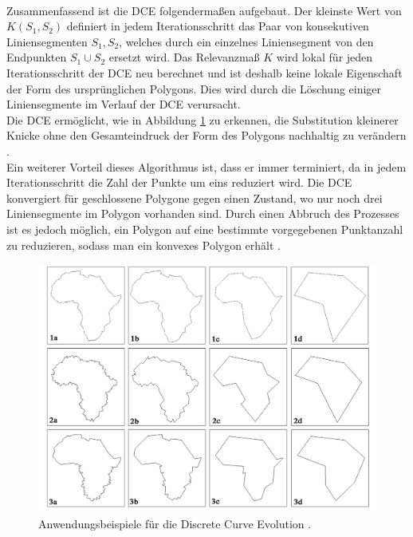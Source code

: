 { \\ 
 Zusammenfassend ist die DCE folgendermaßen aufgebaut. Der kleinste Wert von $K(S_1,S_2)$ definiert in jedem Iterationsschritt das Paar von konsekutiven Liniensegmenten $S_1, S_2$, welches durch ein einzelnes Liniensegment von den Endpunkten $S_1 \cup S_2$ ersetzt wird. Das Relevanzmaß $K$ wird lokal für jeden Iterationsschritt der DCE neu berechnet und ist deshalb keine lokale Eigenschaft der Form des ursprünglichen Polygons. Dies wird durch die Löschung einiger Liniensegmente im Verlauf der DCE verursacht.\\ Die DCE ermöglicht, wie in Abbildung \ref{Bsp_DCE_Bark_Paper} zu erkennen, die Substitution kleinerer Knicke ohne den Gesamteindruck der Form des Polygons nachhaltig zu verändern \citep{Barkowsky2000}.
 \\
 Ein weiterer Vorteil dieses Algorithmus ist, dass er immer terminiert, da in jedem Iterationsschritt die Zahl der Punkte um eins reduziert wird. Die DCE konvergiert für geschlossene Polygone gegen einen Zustand, wo nur noch drei Liniensegmente im Polygon vorhanden sind. Durch einen Abbruch des Prozesses ist es jedoch möglich, ein Polygon auf eine bestimmte vorgegebenen Punktanzahl zu reduzieren, sodass man ein konvexes Polygon erhält \citep{Barkowsky2000}.
 \begin{figure}[ht]
	   \centering
	   \includegraphics*[scale = 1, keepaspectratio, trim=2 2 2 2 ]{images/schem_maps_paper_DCE.png}
	   \caption[Anwendungsbeispiele für die \glqq Discrete Curve Evolution\grqq{}]{Anwendungsbeispiele für die \glqq Discrete Curve Evolution\grqq{}  \citep{Barkowsky2000}.}
	   \label{Bsp_DCE_Bark_Paper}
\end{figure}

 }

